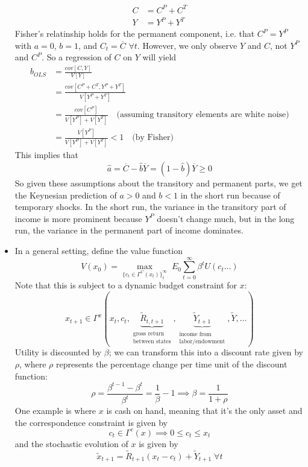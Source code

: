 \documentclass[12pt]{article}
\begin{document}
\begin{itemize}
    \[\begin{split}
        C &= C^P + C^T \\
        Y &= Y^P + Y^T
    \end{split}\]
    Fisher's relatinship holds for the permanent component, i.e. that $C^P = Y^P$ with $a = 0$, $b = 1$, and $C_t = \overline{C}$ $\forall t$. However, we only observe $Y$ and $C$, not $Y^P$ and $C^P$. So a regression of $C$ on $Y$ will yield
    \[\begin{split}
        \hat{b}_{OLS} &= \frac{cov[C,Y]}{V[Y]} \\
        &= \frac{cov[C^P + C^T,Y^P + Y^T]}{V[Y^P + Y^T]} \\
        &= \frac{cov[C^P]}{V[Y^P] + V[Y^T]} \quad \text{(assuming transitory elements are white noise)} \\
        &= \frac{V[Y^P]}{V[Y^P] + V[Y^T]} < 1 \quad \text{(by Fisher)}
    \end{split}\]
    This implies that
    \[\hat{a} = \overline{C} - \hat{b}\overline{Y} = (1-\hat{b})\overline{Y} \geq 0\]
    So given these assumptions about the transitory and permanent parts, we get the Keynesian prediction of $a > 0$ and $b<1$ in the short run because of temporary shocks. In the short run, the variance in the transitory part of income is more prominent because $Y^P$ doesn't change much, but in the long run, the variance in the permanent part of income dominates.
    \item In a general setting, define the value function
    \[V(x_0)  = \max_{\{c_t \in \Gamma^C(x_t)\}_t^{\infty}}\; E_0\sum_{t=0}^{\infty} \beta^tU(c_t\hdots)\]
    Note that this is subject to a dynamic budget constraint for $x$:
    \[x_{t+1} \in \Gamma^x(x_t, c_t, \underbrace{\widetilde{R}_{t,t+1}}_{\substack{\text{gross return} \\ \text{between states}}}, \underbrace{\widetilde{Y}_{t+1}}_{\substack{\text{income from} \\ \text{labor/endowment}}}, \widetilde{Y}, \hdots)\]
    Utility is discounted by $\beta$; we can transform this into a discount rate given by $\rho$, where $\rho$ represents the percentage change per time unit of the discount function:
    \[\rho = \frac{\beta^{t-1} - \beta^{t}}{\beta^t} = \frac{1}{\beta} - 1 \implies \beta = \frac{1}{1+\rho}\]
    One example is where $x$ is cash on hand, meaning that it's the only asset and the correspondence constraint is given by
    \[c_t \in \Gamma^c(x) \implies 0 \leq c_t \leq x_t\]
    and the stochastic evolution of $x$ is given by
    \[\widetilde{x}_{t+1} = \widetilde{R}_{t+1} (x_t - c_t) + \widetilde{Y}_{t+1} \; \forall t\]

\end{itemize}
\end{document}
